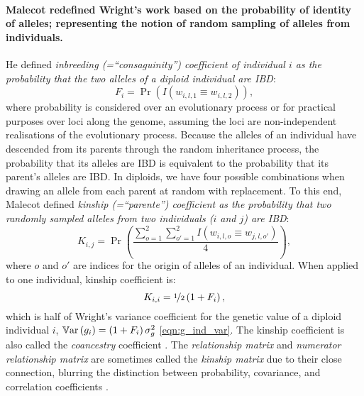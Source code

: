 \paragraph{Malecot redefined Wright's work based on the
probability of identity of alleles; representing the
notion of random sampling of alleles from individuals.}
%
He defined \textit{inbreeding (=``consaguinity'') coefficient of
individual $i$ as the probability that the two alleles of a diploid
individual are IBD}:
%
\begin{equation} \label{eqn:malecot_inbreeding}
  F_i = \Pr\left(I\left(w_{i,l,1} \equiv w_{i,l,2}\right)\right),
\end{equation}
%
where probability is considered over an evolutionary process or for
practical purposes over loci along the genome, assuming the loci are
non-independent realisations of the evolutionary process.
%
Because the alleles of an individual have descended from its parents
through the random inheritance process, the probability that its alleles
are IBD is equivalent to the probability that its parent's alleles are IBD.
%
In diploids, we have four possible combinations when drawing an allele
from each parent at random with replacement.
%
To this end, Malecot defined \textit{kinship (=``parente'') coefficient
as the probability that two randomly sampled alleles from two individuals
($i$ and $j$) are IBD}:
%
\begin{equation} \label{eqn:malecot_kinship}
  K_{i,j} = \Pr\left(\frac{\sum_{o=1}^2 \sum_{o'=1}^2 I\left(w_{i,l,o} \equiv w_{j,l,o'}\right)}{4}\right),
\end{equation} 
%
where $o$ and $o'$ are indices for the origin of alleles of an individual.
%
When applied to one individual, kinship coefficient is:
%
\begin{equation} \label{eqn:kinship_ind}
  K_{i,i} =\nicefrac{1}{2}\left(1 + F_i\right),
\end{equation} 
%
which is half of Wright's variance coefficient for the genetic value
of a diploid individual $i$,
$\mathbb{V}\text{ar}\left(g_i\right)=\left(1+F_i\right)\sigma_g^2$ \eqref{eqn:g_ind_var}.
The kinship coefficient is also called the \textit{coancestry} coefficient
\citep{falconer1996introduction}.
% 
The \textit{relationship matrix} and \textit{numerator relationship matrix}
are sometimes called the \textit{kinship matrix} due to their close
connection, blurring the distinction between probability, covariance, and
correlation coefficients
\citep{jacquard1975inbreeding, templeton1994inbreeding, lacy1995clarification, rousset2002inbreeding}.

